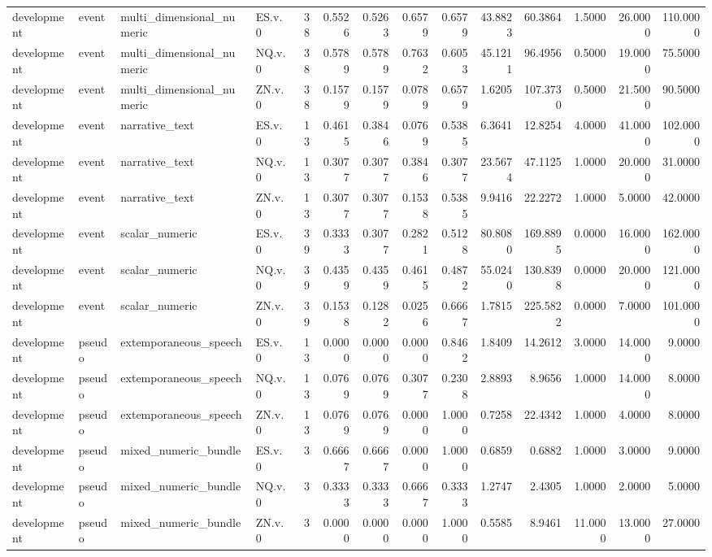 \begin{tabular}{llllrrrrrrrrrr}
development & event & multi_dimensional_numeric & ES.v.0 & 38 & 0.5526 & 0.5263 & 0.6579 & 0.6579 & 43.8823 & 60.3864 & 1.5000 & 26.0000 & 110.0000 \\
development & event & multi_dimensional_numeric & NQ.v.0 & 38 & 0.5789 & 0.5789 & 0.7632 & 0.6053 & 45.1211 & 96.4956 & 0.5000 & 19.0000 & 75.5000 \\
development & event & multi_dimensional_numeric & ZN.v.0 & 38 & 0.1579 & 0.1579 & 0.0789 & 0.6579 & 1.6205 & 107.3730 & 0.5000 & 21.5000 & 90.5000 \\
development & event & narrative_text & ES.v.0 & 13 & 0.4615 & 0.3846 & 0.0769 & 0.5385 & 6.3641 & 12.8254 & 4.0000 & 41.0000 & 102.0000 \\
development & event & narrative_text & NQ.v.0 & 13 & 0.3077 & 0.3077 & 0.3846 & 0.3077 & 23.5674 & 47.1125 & 1.0000 & 20.0000 & 31.0000 \\
development & event & narrative_text & ZN.v.0 & 13 & 0.3077 & 0.3077 & 0.1538 & 0.5385 & 9.9416 & 22.2272 & 1.0000 & 5.0000 & 42.0000 \\
development & event & scalar_numeric & ES.v.0 & 39 & 0.3333 & 0.3077 & 0.2821 & 0.5128 & 80.8080 & 169.8895 & 0.0000 & 16.0000 & 162.0000 \\
development & event & scalar_numeric & NQ.v.0 & 39 & 0.4359 & 0.4359 & 0.4615 & 0.4872 & 55.0240 & 130.8398 & 0.0000 & 20.0000 & 121.0000 \\
development & event & scalar_numeric & ZN.v.0 & 39 & 0.1538 & 0.1282 & 0.0256 & 0.6667 & 1.7815 & 225.5822 & 0.0000 & 7.0000 & 101.0000 \\
development & pseudo & extemporaneous_speech & ES.v.0 & 13 & 0.0000 & 0.0000 & 0.0000 & 0.8462 & 1.8409 & 14.2612 & 3.0000 & 14.0000 & 9.0000 \\
development & pseudo & extemporaneous_speech & NQ.v.0 & 13 & 0.0769 & 0.0769 & 0.3077 & 0.2308 & 2.8893 & 8.9656 & 1.0000 & 14.0000 & 8.0000 \\
development & pseudo & extemporaneous_speech & ZN.v.0 & 13 & 0.0769 & 0.0769 & 0.0000 & 1.0000 & 0.7258 & 22.4342 & 1.0000 & 4.0000 & 8.0000 \\
development & pseudo & mixed_numeric_bundle & ES.v.0 & 3 & 0.6667 & 0.6667 & 0.0000 & 1.0000 & 0.6859 & 0.6882 & 1.0000 & 3.0000 & 9.0000 \\
development & pseudo & mixed_numeric_bundle & NQ.v.0 & 3 & 0.3333 & 0.3333 & 0.6667 & 0.3333 & 1.2747 & 2.4305 & 1.0000 & 2.0000 & 5.0000 \\
development & pseudo & mixed_numeric_bundle & ZN.v.0 & 3 & 0.0000 & 0.0000 & 0.0000 & 1.0000 & 0.5585 & 8.9461 & 11.0000 & 13.0000 & 27.0000 \\

\end{tabular}
